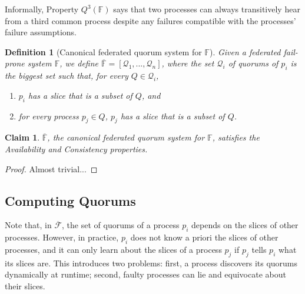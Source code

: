 \documentclass[11pt,letterpaper]{article}
\newtheorem{definition}{Definition}
\newtheorem{claim}{Claim}
\begin{document}
Informally, Property $Q^3(\mathbb{F})$ says that two processes can always transitively hear from a third common process despite any failures compatible with the processes' failure assumptions.

\begin{definition}[Canonical federated quorum system for $\mathbb{F}$]
  \label{def:canonical}
  Given a federated fail-prone system $\mathbb{F}$, we define $\overline{\mathbb{F}}=\left[\mathcal{Q}_1,...,\mathcal{Q}_n\right]$, where the set $\mathcal{Q}_i$ of quorums of $p_i$ is the biggest set such that, for every $Q\in\mathcal{Q}_i$,
  \begin{enumerate}
    \item $p_i$ has a slice that is a subset of $Q$, and
    \item for every process $p_j\in Q$, $p_j$ has a slice that is a subset of $Q$.
  \end{enumerate}
\end{definition}



\begin{claim}
  \label{thm:canonical}
 $\overline{\mathbb{F}}$, the canonical federated quorum system for $\mathbb{F}$, satisfies the Availability and Consistency properties.
\end{claim}
\begin{proof}
  Almost trivial...
\end{proof}

\subsection{Computing Quorums}

Note that, in $\overline{\mathcal{F}}$, the set of quorums of a process $p_i$ depends on the slices of other processes.
However, in practice, $p_i$ does not know a priori the slices of other processes, and it can only learn about the slices of a process $p_j$ if $p_j$ tells $p_i$ what its slices are.
This introduces two problems: first, a process discovers its quorums dynamically at runtime; second, faulty processes can lie and equivocate about their slices.
\end{document}

